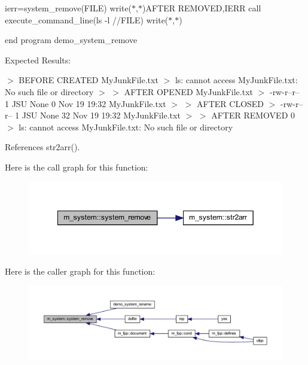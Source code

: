 ierr=system\+\_\+remove(\+F\+I\+L\+E) write($\ast$,$\ast$)\textquotesingle{}A\+F\+T\+ER R\+E\+M\+O\+V\+ED\textquotesingle{},I\+E\+RR call execute\+\_\+command\+\_\+line(\textquotesingle{}ls -\/l \textquotesingle{}//\+F\+I\+LE) write($\ast$,$\ast$)

end program demo\+\_\+system\+\_\+remove

Expected Results\+:

$>$ B\+E\+F\+O\+RE C\+R\+E\+A\+T\+ED My\+Junk\+File.\+txt $>$ ls\+: cannot access \textquotesingle{}My\+Junk\+File.\+txt\textquotesingle{}\+: No such file or directory $>$ $>$ A\+F\+T\+ER O\+P\+E\+N\+ED My\+Junk\+File.\+txt $>$ -\/rw-\/r--r-- 1 J\+SU None 0 Nov 19 19\+:32 My\+Junk\+File.\+txt $>$ $>$ A\+F\+T\+ER C\+L\+O\+S\+ED $>$ -\/rw-\/r--r-- 1 J\+SU None 32 Nov 19 19\+:32 My\+Junk\+File.\+txt $>$ $>$ A\+F\+T\+ER R\+E\+M\+O\+V\+ED 0 $>$ ls\+: cannot access \textquotesingle{}My\+Junk\+File.\+txt\textquotesingle{}\+: No such file or directory 

References str2arr().

Here is the call graph for this function\+:
\nopagebreak
\begin{figure}[H]
\begin{center}
\leavevmode
\includegraphics[width=349pt]{namespacem__system_a730ae64294e3cd73bde8f0c63cdf9972_cgraph}
\end{center}
\end{figure}
Here is the caller graph for this function\+:
\nopagebreak
\begin{figure}[H]
\begin{center}
\leavevmode
\includegraphics[width=350pt]{namespacem__system_a730ae64294e3cd73bde8f0c63cdf9972_icgraph}
\end{center}
\end{figure}
\mbox{\label{namespacem__system_adfbaf3d17790da9ba0c520683d5b8003}} 

